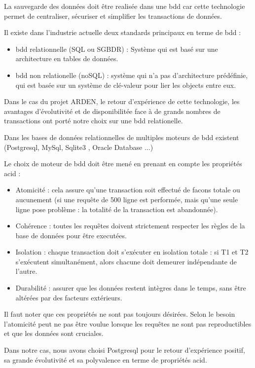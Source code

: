 La sauvegarde des données doit être realisée dans une \gls{bdd} car cette technologie permet de centraliser, sécuriser et simplifier les transactions de données.

Il existe dans l'industrie actuelle deux standards principaux en terme de \gls{bdd} :
\begin{itemize}
 \item \gls{bdd} relationnelle (SQL ou SGBDR) : Système qui est basé sur une architecture en tables de données.
 \item \gls{bdd} non relationelle (noSQL) : système qui n'a pas d'architecture prédéfinie, qui est basée sur un système de clé-valeur pour lier les objects entre eux. \cite{BDD_theses}
\end{itemize}

Dans le cas du projet ARDEN, le retour d'expérience de cette technologie, les avantages d'évolutivité et de disponibilitée face à de grands nombres de transactions ont porté notre choix sur une \gls{bdd} relationelle.

Dans les bases de données relationnelles de multiples moteurs de \gls{bdd} existent (Postgresql, MySql, Sqlite3 , Oracle Database ...)

Le choix de moteur de \gls{bdd} doit être mené en prenant en compte les propriétés \gls{acid} :
\begin{itemize}
 \item Atomicité : cela assure qu'une transaction soit effectué de facons totale ou aucunement (si une requête de 500 ligne est performée, mais qu'une seule ligne pose problème : la totalité de la transaction est abandonnée). 
 \item Cohérence : toutes les requêtes doivent strictement respecter les règles de la base de données pour être executées.
 \item Isolation : chaque transaction doit s'exécuter en isolation totale : si T1 et T2 s'exécutent simultanément, alors chacune doit demeurer indépendante de l'autre. 
 \item Durabilité : assurer que les données restent intègres dans le temps, sans être altérées par des facteurs extérieurs.
 \cite{wikipedia_acid}
\end{itemize}

Il faut noter que ces propriétés ne sont pas toujours désirées. Selon le besoin l'atomicité peut ne pas être voulue lorsque les requêtes ne sont pas reproductibles et que les données sont cruciales.

Dans notre cas, nous avons choisi Postgresql pour le retour d'expérience positif, sa grande évolutivité et sa polyvalence en terme de propriétés \gls{acid}.
